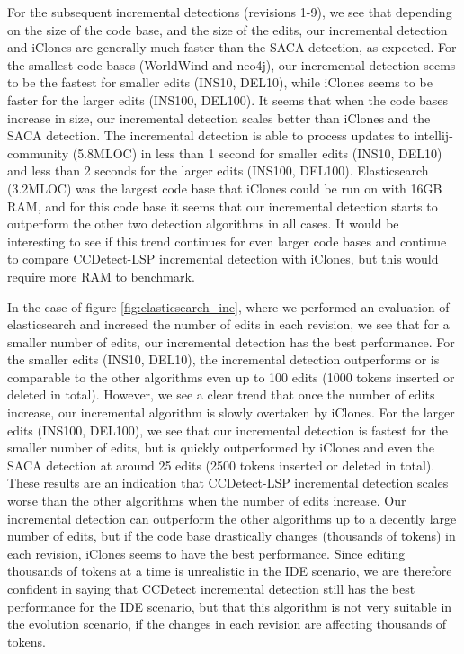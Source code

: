 For the subsequent incremental detections (revisions 1-9), we see that depending on the
size of the code base, and the size of the edits, our incremental detection and iClones
are generally much faster than the SACA detection, as expected. For the smallest code
bases (WorldWind and neo4j), our incremental detection seems to be the fastest for smaller
edits (INS10, DEL10), while iClones seems to be faster for the larger edits (INS100,
DEL100). It seems that when the code bases increase in size, our incremental detection
scales better than iClones and the SACA detection. The incremental detection is able to
process updates to intellij-community (5.8MLOC) in less than 1 second for smaller edits
(INS10, DEL10) and less than 2 seconds for the larger edits (INS100, DEL100).
Elasticsearch (3.2MLOC) was the largest code base that iClones could be run on with 16GB
RAM, and for this code base it seems that our incremental detection starts to outperform
the other two detection algorithms in all cases. It would be interesting to see if this
trend continues for even larger code bases and continue to compare CCDetect-LSP
incremental detection with iClones, but this would require more RAM to benchmark. 

In the case of figure \ref{fig:elasticsearch_inc}, where we performed an evaluation of
elasticsearch and incresed the number of edits in each revision, we see that for a smaller
number of edits, our incremental detection has the best performance. For the smaller edits
(INS10, DEL10), the incremental detection outperforms or is comparable to the other
algorithms even up to 100 edits (1000 tokens inserted or deleted in total). However, we
see a clear trend that once the number of edits increase, our incremental algorithm is
slowly overtaken by iClones. For the larger edits (INS100, DEL100), we see that our
incremental detection is fastest for the smaller number of edits, but is quickly
outperformed by iClones and even the SACA detection at around 25 edits (2500 tokens
inserted or deleted in total). These results are an indication that CCDetect-LSP
incremental detection scales worse than the other algorithms when the number of edits
increase. Our incremental detection can outperform the other algorithms up to a decently
large number of edits, but if the code base drastically changes (thousands of tokens) in
each revision, iClones seems to have the best performance. Since editing thousands of
tokens at a time is unrealistic in the IDE scenario, we are therefore confident in saying
that CCDetect incremental detection still has the best performance for the IDE scenario,
but that this algorithm is not very suitable in the evolution scenario, if the changes in
each revision are affecting thousands of tokens.

